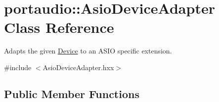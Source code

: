 \hypertarget{classportaudio_1_1_asio_device_adapter}{}\section{portaudio\+:\+:Asio\+Device\+Adapter Class Reference}
\label{classportaudio_1_1_asio_device_adapter}


Adapts the given \hyperlink{classportaudio_1_1_device}{Device} to an A\+S\+IO specific extension.  




{\ttfamily \#include $<$Asio\+Device\+Adapter.\+hxx$>$}

\subsection*{Public Member Functions}
